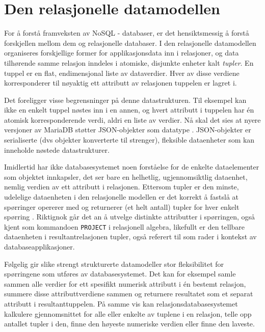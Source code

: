 \section{Den relasjonelle datamodellen} \label{relational}

For å forstå framveksten av NoSQL - databaser, er det hensiktsmessig å forstå forskjellen mellom dem og relasjonelle databaser. I den relasjonelle datamodellen organiseres forskjellige former for applikasjonsdata inn i relasjoner, og data tilhørende samme relasjon inndeles i atomiske, disjunkte enheter kalt \emph{tupler}. En tuppel er en flat, endimensjonal liste av dataverdier. Hver av disse verdiene korresponderer til nøyaktig ett attributt av relasjonen tuppelen er lagret i.

Det foreligger visse begrensninger på denne datastrukturen. Til eksempel kan ikke en enkelt tuppel nøstes inn i en annen, og hvert attributt i tuppelen har én atomisk korresponderende verdi, aldri en liste av verdier. Nå skal det sies at nyere versjoner av MariaDB støtter JSON-objekter som datatype \citep{mariadb}. JSON-objekter er serialiserte (dvs objekter konverterte til strenger), fleksible dataenheter som kan inneholde nøstede datastrukturer.

Imidlertid har ikke databasesystemet noen forståelse for de enkelte dataelementer som objektet innkapsler, det ser bare en helhetlig, ugjennomsiktlig dataenhet, nemlig verdien av ett attributt i relasjonen. Ettersom tupler er den minste, udelelige dataenheten i den relasjonelle modellen er det korrekt å fastslå at spørringer opererer med og returnerer (et helt antall) tupler for hver enkelt spørring \citep{sadalage2013}. Riktignok går det an å utvelge distinkte attributter i spørringen, også kjent som kommandoen \texttt{PROJECT} i relasjonell algebra, likefullt er den tellbare dataenheten i resultantrelasjonen tupler, også referert til som rader i kontekst av databaseapplikasjoner.

Følgelig gir slike strengt strukturerte datamodeller stor fleksibilitet for spørringene som utføres av databasesystemet. Det kan for eksempel samle sammen alle verdier for ett spesifikt numerisk attributt i én bestemt relasjon, summere disse  attributtverdiene sammen og returnere resultatet som et separat attributt i resultanttuppelen. På samme vis kan relasjonsdatabasesystemet kalkulere gjennomsnittet for alle eller enkelte av tuplene i en relasjon, telle opp antallet tupler i den, finne den høyeste numeriske verdien eller finne den laveste.

